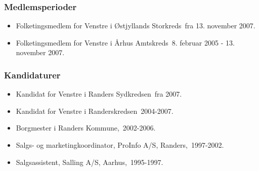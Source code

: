 \documentclass[11pt, a4paper]{awesome-cv}
\begin{document}
\begin{cvletter}
\subsubsection*{Medlemsperioder}
\begin{itemize}
\item Folketingsmedlem for Venstre i Østjyllands Storkreds fra 13. november 2007.
\item Folketingsmedlem for Venstre i Århus Amtskreds 8. februar 2005 - 13. november 2007.
\end{itemize}
\subsubsection*{Kandidaturer}
\begin{itemize}
\item Kandidat for Venstre i Randers Sydkredsen fra 2007.
\item Kandidat for Venstre i Randerskredsen 2004-2007.
\end{itemize}
\begin{itemize}
\item Borgmester i Randers Kommune, 2002-2006.
\item Salgs- og marketingkoordinator, ProInfo A/S, Randers, 1997-2002.
\item Salgsassistent, Salling A/S, Aarhus, 1995-1997.
\end{itemize}
\end{cvletter}
\end{document}
